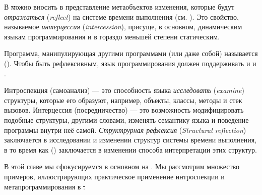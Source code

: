 \documentclass[a4paper,10pt,twoside]{book}
\begin{document}
В \st можно вносить в представление метаобъектов изменения, которые будут \emph{отражаться} (\emph{reflect}) на системе времени выполнения (см. ). 
Это свойство, называемое \emph{интерцессия} (\emph{intercession}), присуще, в основном, динамическим языкам программирования и в гораздо меньшей степени статическим.

Программа, манипулирующая другими программами (или даже собой) называется  ().
Чтобы быть рефлексивным, язык программирования должен поддерживать и  и .

Интроспекция (самоанализ) --- это способность языка \emph{исследовать} (\emph{examine}) структуры, которые его образуют, например, объекты, классы, методы и стек вызовов.
Интерцессия (посредничество) --- это возможность модифицировать подобные структуры, другими словами, изменять семантику языка и поведение программы внутри неё самой.
\emph{Структрурная рефлексия} (\emph{Structural reflection}) заключается в исследовании и изменении структур системы времени выполнения, в то время как  () заключается в изменении способа интерпретации этих структур.

В этой главе мы сфокусируемся в основном на .
Мы рассмотрим множество примеров, иллюстрирующих практическое применение интроспекции и метапрограммирования в \st.
\end{document}
